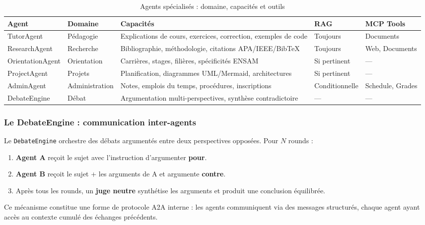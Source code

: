 \documentclass[12pt, a4paper]{article}
\begin{document}
\begin{table}[H]
\centering
\caption{Agents spécialisés : domaine, capacités et outils}
\label{tab:agents_detail}
\small
\begin{tabularx}{\textwidth}{l l X l l}
\toprule
\textbf{Agent} & \textbf{Domaine} & \textbf{Capacités} & \textbf{RAG} & \textbf{MCP Tools} \\
\midrule
TutorAgent & Pédagogie & Explications de cours, exercices, correction, exemples de code & Toujours & Documents \\
\addlinespace
ResearchAgent & Recherche & Bibliographie, méthodologie, citations APA/IEEE/BibTeX & Toujours & Web, Documents \\
\addlinespace
OrientationAgent & Orientation & Carrières, stages, filières, spécificités ENSAM & Si pertinent & — \\
\addlinespace
ProjectAgent & Projets & Planification, diagrammes UML/Mermaid, architectures & Si pertinent & — \\
\addlinespace
AdminAgent & Administration & Notes, emplois du temps, procédures, inscriptions & Conditionnelle & Schedule, Grades \\
\addlinespace
DebateEngine & Débat & Argumentation multi-perspectives, synthèse contradictoire & — & — \\
\bottomrule
\end{tabularx}
\end{table}

\subsubsection{Le DebateEngine : communication inter-agents}

Le \texttt{DebateEngine} orchestre des débats argumentés entre deux perspectives opposées. Pour $N$ rounds :

\begin{enumerate}
  \item \textbf{Agent A} reçoit le sujet avec l'instruction d'argumenter \textbf{pour}.
  \item \textbf{Agent B} reçoit le sujet + les arguments de A et argumente \textbf{contre}.
  \item Après tous les rounds, un \textbf{juge neutre} synthétise les arguments et produit une conclusion équilibrée.
\end{enumerate}

Ce mécanisme constitue une forme de protocole A2A interne : les agents communiquent via des messages structurés, chaque agent ayant accès au contexte cumulé des échanges précédents.
\end{document}
